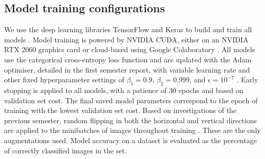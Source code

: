 \documentclass[12pt]{article}
\begin{document}


\subsection{Model training configurations}
We use the deep learning libraries TensorFlow and Keras to build and train all models \cite{Abadi16, Gulli17}. Model training is powered by NVIDIA CUDA, either on an NVIDIA RTX 2060 graphics card or cloud-based using Google Colaboratory \cite{Cook12, Bisong19}. All models use the categorical cross-entropy loss function and are updated with the Adam optimiser, detailed in the first semester report, with variable learning rate and other fixed hyperparameter settings of $\beta_1=0.9$, $\beta_2=0.999$, and $\epsilon=10^{-7}$ \cite{Heaton20, Kingma14}. Early stopping is applied to all models, with a patience of 30 epochs and based on validation set cost. The final saved model parameters correspond to the epoch of training with the lowest validation set cost. Based on investigations of the previous semester, random flipping in both the horizontal and vertical directions are applied to the minibatches of images throughout training \cite{Heaton20}. These are the only augmentations used. Model accuracy on a dataset is evaluated as the percentage of correctly classified images in the set. 
\end{document}
